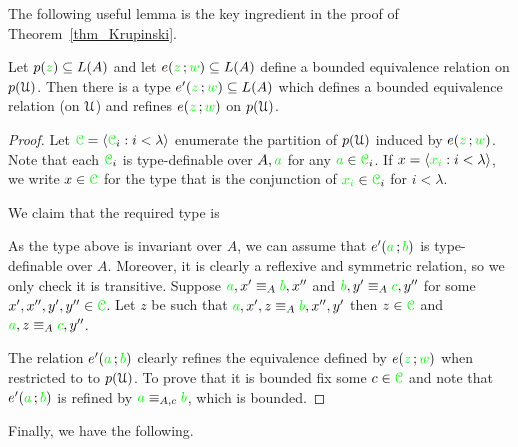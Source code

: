 \documentclass[creche.tex]{subfiles}
\begin{document}
The following useful lemma is the key ingredient in the proof of Theorem~\ref{thm_Krupinski}.

\begin{lemma}\label{lem_beq_global}
Let $p({\color{green} z})\subseteq L(A)$ and let $e({\color{green} z}\,;{\color{green} w})\subseteq L(A)$ define a bounded equivalence relation on $p(\EuScript U)$. Then there is a type $e'({\color{green} z}\,;{\color{green} w})\subseteq L(A)$ which defines a bounded equivalence relation (on $\EuScript U$) and refines $e({\color{green} z}\,;{\color{green} w})$ on  $p(\EuScript U)$.
\end{lemma}
\begin{proof} 
Let ${\color{green}\EuScript C}=\langle{\color{green}\EuScript C}_i:i<\lambda\rangle$ enumerate the partition of $p(\EuScript U)$ induced by $e({\color{green} z}\,;{\color{green} w})$. Note that each ${\color{green}\EuScript C}_i$ is type-definable over $A,{\color{green} a}$ for any ${\color{green} a}\in{\color{green}\EuScript C}_i$. If $x=\langle{\color{green}x_i}:i<\lambda\rangle$, we write $x\in{\color{green}\EuScript C}$ for the type that is the conjunction of ${\color{green} x_i}\in{\color{green}\EuScript C}_i$ for $i<\lambda$. 

We claim that the required type is 


As the type above is invariant over $A$, we can assume that $e'({\color{green} a}\,;{\color{green} b})$ is type-definable over $A$. Moreover, it is clearly a reflexive and symmetric relation, so we only check it is transitive. Suppose ${\color{green} a},x'\equiv_A{\color{green} b},x''$ and  ${\color{green} b},y'\equiv_A{\color{green} c},y''$ for some $x',x'',y',y''\in {\color{green}\EuScript C}$. Let $z$ be such that ${\color{green} a},x',z\equiv_A{\color{green} b},x'',y'$ then   $z\in{\color{green}\EuScript C}$ and ${\color{green} a},z\equiv_A{\color{green} c},y''$.

The relation $e'({\color{green} a}\,;{\color{green} b})$ clearly refines the equivalence defined by $e({\color{green} z}\,;{\color{green} w})$ when restricted to  to $p(\EuScript U)$. To prove that it is bounded fix some $c\in{\color{green}\EuScript C}$ and note that $e'({\color{green} a}\,;{\color{green} b})$  is refined by ${\color{green} a}\equiv_{A,c}{\color{green} b}$, which is bounded. 
\end{proof}

Finally, we have the following.
\end{document}
